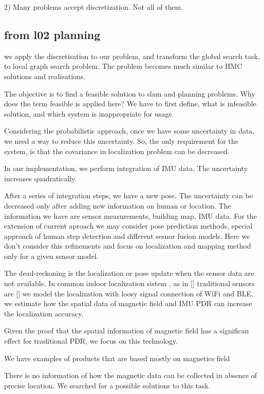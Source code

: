 \documentclass[conference]{IEEEtran}
\begin{document}
2) Many problems accept discretization. Not all of them.

\subsection{from l02 planning}

we apply the discretisation to our problem, and transform the global search task, to local graph search problem. The problem becomes much similar to HMC solutions and realisations.

The objective is to find a feasible solution to slam and planning problems. Why does the term feasible is applied here? We have to first define, what is infeasible solution, and which system is inappropriate for usage.

Considering the probabilistic approach, once we have some uncertainty in data, we need a way to reduce this uncertainty. So, the only requirement for the system, is that the covariance in localization problem can be decreased.

In our implementation, we perform integration of IMU data. The uncertainty increases quadratically.

After a series of integration steps, we have a new pose. The uncertainty can be decreased only after adding new information on human or location. The information we have are sensor measurements, building map, IMU data. For the extension of current aproach we may consider pose prediction methods, special approach of human step detection and different sesnor fusion models. Here we don’t consider this refinements and focus on localization and mapping method only for a given sensor model.

The dead-reckoning is the localization or pose update when the sensor data are not available. In common indoor localization sistem , as in [] traditional sensors are [] we model the localization with loosy signal connection of WiFi and BLE, we estimate how the spatial data of magnetic field and IMU PDR can increase the localization accuracy.

Given the proof that the spatial information of magnetic field has a significan effect for traditional PDR, we focus on this technology.

We have examples of products that are based mostly on magnetics field

There is no information of how the magnetic data can be collected in absence of precise location. We searched for a possible solutions to this task.
\end{document}
